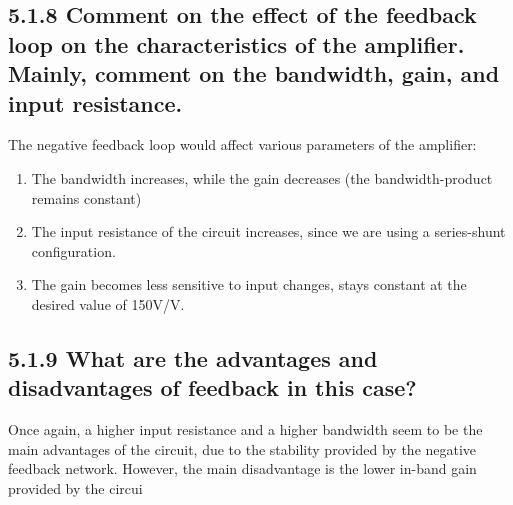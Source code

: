 \documentclass[12pt]{article}
\begin{document}
\subsection*{5.1.8 Comment on the effect of the feedback loop on the characteristics of the 
amplifier. Mainly, comment on the bandwidth, gain, and input resistance.}

The negative feedback loop would affect various parameters of the amplifier:
\begin{enumerate}
\item
The bandwidth increases, while the gain decreases (the bandwidth-product remains constant)
\item
The input resistance of the circuit increases, since we are using a series-shunt configuration.
\item
The gain becomes less sensitive to input changes, stays constant at the desired value of 150V/V.
\end{enumerate}

\subsection*{5.1.9 What are the advantages and disadvantages of feedback in this case?}

Once again, a higher input resistance and a higher bandwidth seem to be the main advantages of the circuit, due to the stability provided by the negative feedback network. However, the main disadvantage is the lower in-band gain provided by the circui
\end{document}
